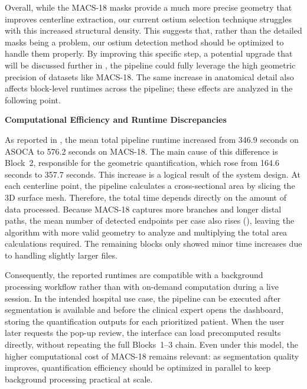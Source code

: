Overall, while the MACS-18 masks provide a much more precise geometry that improves centerline extraction, our current ostium selection technique struggles with this increased structural density. This suggests that, rather than the detailed masks being a problem, our ostium detection method should be optimized to handle them properly. By improving this specific step, a potential upgrade that will be discussed further in , the pipeline could fully leverage the high geometric precision of datasets like MACS-18. The same increase in anatomical detail also affects block-level runtimes across the pipeline; these effects are analyzed in the following point.

\vspace{0.75em}
\noindent\textbf{Computational Efficiency and Runtime Discrepancies}\par
\vspace{0.4em}
\noindent
As reported in , the mean total pipeline runtime increased from 346.9 seconds on ASOCA to 576.2 seconds on MACS-18. The main cause of this difference is Block~2, responsible for the geometric quantification, which rose from 164.6 seconds to 357.7 seconds. This increase is a logical result of the system design. At each centerline point, the pipeline calculates a cross-sectional area by slicing the 3D surface mesh. Therefore, the total time depends directly on the amount of data processed. Because MACS-18 captures more branches and longer distal paths, the mean number of detected endpoints per case also rises (), leaving the algorithm with more valid geometry to analyze and multiplying the total area calculations required. The remaining blocks only showed minor time increases due to handling slightly larger files.

Consequently, the reported runtimes are compatible with a background processing workflow rather than with on-demand computation during a live session. In the intended hospital use case, the pipeline can be executed after segmentation is available and before the clinical expert opens the dashboard, storing the quantification outputs for each prioritized patient. When the user later requests the pop-up review, the interface can load precomputed results directly, without repeating the full Blocks~1--3 chain. Even under this model, the higher computational cost of MACS-18 remains relevant: as segmentation quality improves, quantification efficiency should be optimized in parallel to keep background processing practical at scale.


